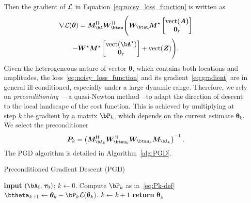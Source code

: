 \documentclass[conference,english]{IEEEtran}
\begin{document}
Then the gradient of $\mathcal{L}$ in Equation~\eqref{eq:noisy_loss_function} is written as
\begin{multline} \label{eq:gradient}
    \nabla \mathcal{L}(\bm{\theta}) = \bm{M}_{\bA}^\herm \bm{W}_{\btau}^\herm \Bigg( \bm{W}_{\btau} \bm{M}^\star
    \begin{bmatrix} \vectt(\bm{A)} \\ \bm{0}_r \end{bmatrix} \\
    - \bm{W}^\star \bm{M}^\star \begin{bmatrix} \vectt(\bA^\star)  \\ \bm{0}_r \end{bmatrix} + \vectt(\bm{Z}) \Bigg).
\end{multline}
Given the heterogeneous nature of vector $\bm{\theta}$, which contains both locations and amplitudes, the loss~\eqref{eq:noisy_loss_function} and its gradient~\eqref{eq:gradient} are in general ill-conditioned, especially under a large dynamic range. Therefore, we rely on \emph{preconditioning}~\cite{ferreiradacosta2023LocalGeometry}---a quasi-Newton method---to adapt the direction of descent to the local landscape of the cost function. This is achieved by multiplying at step $k$ the gradient by a matrix $\bP_k$, which depends on the current estimate $\bm{\theta}_k$.
We select the preconditioner
\begin{equation}\label{eq:Pk-def}
    \bm{P}_k = \left( \bm{M}_{\bA_k}^\herm \bm{W}_{\btau_k}^\herm \bm{W}_{\btau_k} \bm{M}_{\bA_k}\right)^{-1}.
\end{equation}
The PGD algorithm is detailed in Algorithm~\ref{alg:PGD}. 
\begin{algorithm}[t]
\caption{Preconditioned Gradient Descent (PGD)}
\begin{algorithmic}[1]
\State \textbf{input} \((\bA_0, \bm{\tau}_0)\); $k \gets 0$.
\State Compute $\bP_k$ as in~\eqref{eq:Pk-def}
\State  \(\btheta_{k+1} \gets \bm{\theta}_k - \bP_k  \mathcal{L}(\bm{\theta}_k) \).
\State \(k \gets k+1\)
\EndWhile
\State \textbf{return} \(\bm{\theta}_k\)
\end{algorithmic}\label{alg:PGD}
\end{algorithm}
\end{document}
